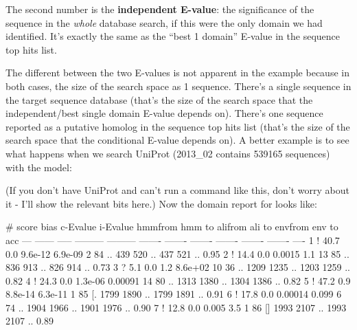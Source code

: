 The second number is the \textbf{independent E-value}: the
significance of the sequence in the \emph{whole} database search, if
this were the only domain we had identified. It's exactly the same as
the ``best 1 domain'' E-value in the sequence top hits list.

The different between the two E-values is not apparent in the
 example because in both cases, the size of the
search space as 1 sequence. There's a single sequence in the target
sequence database (that's the size of the search space that the
independent/best single domain E-value depends on). There's one
sequence reported as a putative homolog in the sequence top hits list
(that's the size of the search space that the conditional E-value
depends on). A better example is to see what happens when we search
UniProt (2013\_02 contains 539165 sequences) with the  model:


(If you don't have UniProt and can't run a command like this, don't
worry about it - I'll show the relevant bits here.) Now the domain
report for  looks like:

\begin{samepage}
\begin{sreoutput}
   #    score  bias  c-Evalue  i-Evalue hmmfrom  hmm to    alifrom  ali to    envfrom  env to     acc
 ---   ------ ----- --------- --------- ------- -------    ------- -------    ------- -------    ----
   1 !   40.7   0.0   9.6e-12   6.9e-09       2      84 ..     439     520 ..     437     521 .. 0.95
   2 !   14.4   0.0    0.0015       1.1      13      85 ..     836     913 ..     826     914 .. 0.73
   3 ?    5.1   0.0       1.2   8.6e+02      10      36 ..    1209    1235 ..    1203    1259 .. 0.82
   4 !   24.3   0.0   1.3e-06   0.00091      14      80 ..    1313    1380 ..    1304    1386 .. 0.82
   5 !   47.2   0.9   8.8e-14   6.3e-11       1      85 [.    1799    1890 ..    1799    1891 .. 0.91
   6 !   17.8   0.0   0.00014     0.099       6      74 ..    1904    1966 ..    1901    1976 .. 0.90
   7 !   12.8   0.0     0.005       3.5       1      86 []    1993    2107 ..    1993    2107 .. 0.89
\end{sreoutput}
\end{samepage}

